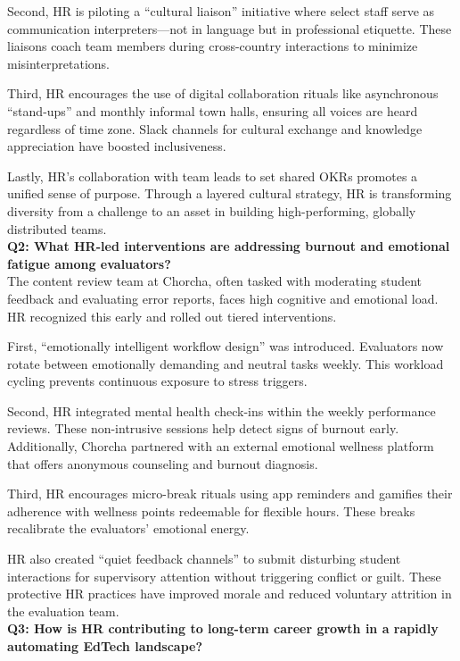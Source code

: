 \documentclass[12pt,a4paper,oneside]{book}
\begin{document}
Second, HR is piloting a “cultural liaison” initiative where select staff serve as communication interpreters—not in language but in professional etiquette. These liaisons coach team members during cross-country interactions to minimize misinterpretations.

Third, HR encourages the use of digital collaboration rituals like asynchronous “stand-ups” and monthly informal town halls, ensuring all voices are heard regardless of time zone. Slack channels for cultural exchange and knowledge appreciation have boosted inclusiveness.

Lastly, HR’s collaboration with team leads to set shared OKRs promotes a unified sense of purpose. Through a layered cultural strategy, HR is transforming diversity from a challenge to an asset in building high-performing, globally distributed teams.\\

\textbf{Q2: What HR-led interventions are addressing burnout and emotional fatigue among evaluators?} \\

The content review team at Chorcha, often tasked with moderating student feedback and evaluating error reports, faces high cognitive and emotional load. HR recognized this early and rolled out tiered interventions.

First, “emotionally intelligent workflow design” was introduced. Evaluators now rotate between emotionally demanding and neutral tasks weekly. This workload cycling prevents continuous exposure to stress triggers.

Second, HR integrated mental health check-ins within the weekly performance reviews. These non-intrusive sessions help detect signs of burnout early. Additionally, Chorcha partnered with an external emotional wellness platform that offers anonymous counseling and burnout diagnosis.

Third, HR encourages micro-break rituals using app reminders and gamifies their adherence with wellness points redeemable for flexible hours. These breaks recalibrate the evaluators’ emotional energy.

HR also created “quiet feedback channels” to submit disturbing student interactions for supervisory attention without triggering conflict or guilt. These protective HR practices have improved morale and reduced voluntary attrition in the evaluation team.\\

\textbf{Q3: How is HR contributing to long-term career growth in a rapidly automating EdTech landscape?} \\
\end{document}
